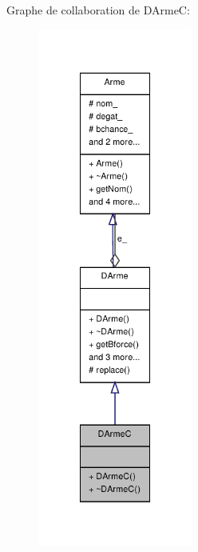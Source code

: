 Graphe de collaboration de D\-Arme\-C\-:
\nopagebreak
\begin{figure}[H]
\begin{center}
\leavevmode
\includegraphics[width=144pt]{class_d_arme_c__coll__graph}
\end{center}
\end{figure}

